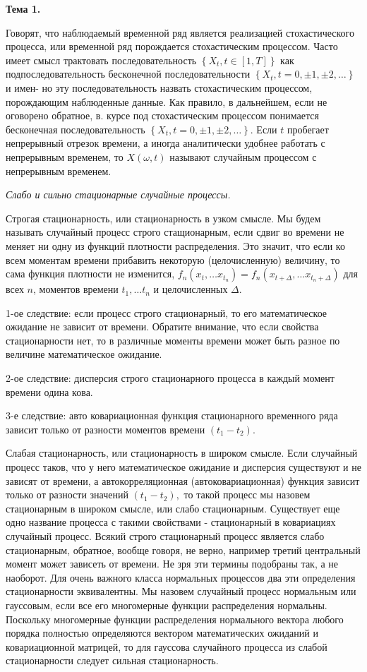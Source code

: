\documentclass[a4paper,8pt]{article} %
\begin{document}
\textbf{Тема 1.}

Говорят, что наблюдаемый временной ряд является реализацией стохастического процесса, или временной ряд порождается стохастическим процессом. Часто имеет смысл трактовать последовательность $\left\{X_{t}, t \in[1, T]\right\}$ как
подпоследовательность бесконечной последовательности $\left\{X_{t}, t=0,\pm 1,\pm 2, \ldots\right\}$ и имен-
но эту последовательность назвать стохастическим процессом, порождающим наблюденные данные. Как правило, в дальнейшем, если не оговорено обратное, в. курсе под стохастическим процессом понимается бесконечная последовательность $\left\{X_{t}, t=0,\pm 1,\pm 2, \ldots\right\} .$ Если $t$ пробегает непрерывный отрезок времени, а иногда аналитически удобнее работать с непрерывным временем, то $X(\omega, t)$ называют случайным процессом с непрерывным временем. 

\textit{Слабо и сильно стационарные случайные процессы. }

Строгая стационарность, или стационарность в узком смысле. Мы будем называть случайный процесс строго стащионарным, если сдвиг во времени не меняет ни одну из функций плотности распределения. Это значит, что если ко всем моментам времени прибавить некоторую (целочисленную) величину, то сама функция плотности не изменится, $f_{n}\left(x_{t}, \ldots x_{t_{n}}\right)=f_{n}\left(x_{t+\Delta}, \ldots x_{t_{n}+\Delta}\right)$ для
всех $n$, моментов времени $t_{1}, \ldots t_{n}$ и целочисленных $\Delta .$

1-ое следствие: если процесс строго стационарный, то его математическое ожидание не зависит от времени. Обратите внимание, что если свойства стационарности нет, то в различные моменты времени может быть разное по величине математическое ожидание.

2-ое следствие: дисперсия строго стационарного процесса в каждый момент времени одина кова.

3-е следствие: авто ковариационная функция стационарного временного ряда зависит только от разности моментов времени $\left(t_{1}-t_{2}\right) .$


Слабая стационарность, или стационарность в широком смысле. Если случайный процесс таков, что у него математическое ожидание и дисперсия существуют и не зависят от времени, а автокорреляционная (автоковариационная) функция зависит только от разности значений $\left(t_{1}-t_{2}\right),$ то такой процесс мы назовем стационарным в широком смысле, или слабо стационарным. Существует еще одно название процесса с такими свойствами - стационарный в ковариациях случайный процесс. Всякий строго стационарный процесс является слабо стационарным, обратное, вообще говоря, не верно, например третий центральный момент может зависеть от времени. Не зря эти термины подобраны так, а не наоборот. Для очень важного класса нормальных процессов два эти определения стационарности эквивалентны. Мы назовем случайный процесс нормальным или гауссовым, если все его многомерные функции распределения нормальны. Поскольку многомерные функции распределения нормального вектора любого порядка полностью определяются вектором математических ожиданий и ковариационной матрицей, то для гауссова случайного процесса из слабой стационарности следует сильная стационарность.
\end{document}
